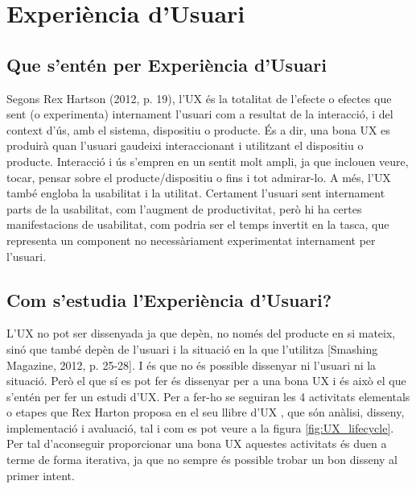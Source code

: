 
\chapter{Experiència d'Usuari}
\section{Que s'entén per Experiència d'Usuari}
Segons Rex Hartson (2012, p. 19)\cite{UX_Book}, l'\ac{UX} és la totalitat de l'efecte o efectes que sent (o experimenta) internament l'usuari com a resultat de la interacció, i del context d'ús, amb el sistema, dispositiu o producte. És a dir, una bona \ac{UX} es produirà quan l'usuari gaudeixi interaccionant i utilitzant el dispositiu o producte. Interacció i ús s'empren en un sentit molt ampli, ja que inclouen veure, tocar, pensar sobre el producte/dispositiu o fins i tot admirar-lo. 
A més, l'\ac{UX} també engloba la usabilitat i la utilitat. Certament l'usuari sent internament parts de la usabilitat, com l'augment de productivitat, però hi ha certes manifestacions de usabilitat, com podria ser el temps invertit en la tasca, que representa un component no necessàriament experimentat internament per l'usuari.

\section{Com s'estudia l'Experiència d'Usuari?}
L'\ac{UX} no pot ser dissenyada ja que depèn, no només del producte en si mateix, sinó que també depèn de l'usuari i la situació en la que l'utilitza [Smashing Magazine, 2012, p. 25-28]\cite{Smashing_User_Experience_Design}. I és que no és possible dissenyar ni l'usuari ni la situació. Però el que sí es pot fer és dissenyar per a una bona \ac{UX} i és això el que s'entén per fer un estudi d'\ac{UX}. Per a fer-ho se seguiran les 4 activitats elementals o etapes que Rex Harton proposa en el seu llibre d'\ac{UX} \cite{UX_Book}, que són anàlisi, disseny, implementació i avaluació, tal i com es pot veure a la figura \ref{fig:UX_lifecycle}. Per tal d'aconseguir proporcionar una bona \ac{UX} aquestes activitats és duen a terme de forma iterativa, ja que no sempre és possible trobar un bon disseny al primer intent.

